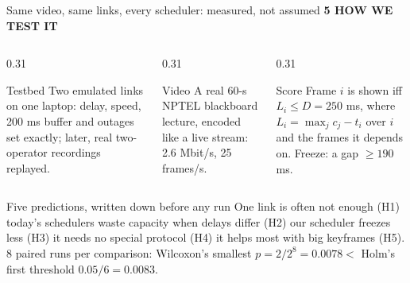 \documentclass[aspectratio=169,11pt]{beamer}
\newcommand{\eyebrow}[1]{{\color{accent}\footnotesize\bfseries\MakeUppercase{#1}}\par\smallskip}
\begin{document}
\begin{frame}{Same video, same links, every scheduler: measured, not assumed}
  \eyebrow{5 \textperiodcentered{} How we test it}
  \small
  \begin{columns}[T]
    \begin{column}{0.31\textwidth}
      \begin{block}{Testbed}
        Two emulated links on one laptop: delay, speed, 200 ms buffer and outages set exactly; later, real two-operator recordings replayed.
      \end{block}
    \end{column}
    \begin{column}{0.31\textwidth}
      \begin{block}{Video}
        A real 60-s NPTEL blackboard lecture, encoded like a live stream: 2.6 Mbit/s, 25 frames/s.
      \end{block}
    \end{column}
    \begin{column}{0.31\textwidth}
      \begin{block}{Score}
        Frame $i$ is shown iff $L_i \le D = 250$ ms, where $L_i = \max_{j} c_j - t_i$ over $i$ and the frames it depends on. Freeze: a gap $\ge 190$ ms.
      \end{block}
    \end{column}
  \end{columns}
  \medskip
  \begin{alertblock}{Five predictions, written down before any run}
    One link is often not enough (H1) \textperiodcentered{} today's schedulers waste capacity when delays differ (H2) \textperiodcentered{} our scheduler freezes less (H3) \textperiodcentered{} it needs no special protocol (H4) \textperiodcentered{} it helps most with big keyframes (H5).\\[2pt]
    {\footnotesize 8 paired runs per comparison: Wilcoxon's smallest $p = 2/2^8 = 0.0078 <$ Holm's first threshold $0.05/6 = 0.0083$.}
  \end{alertblock}
\end{frame}
\end{document}
